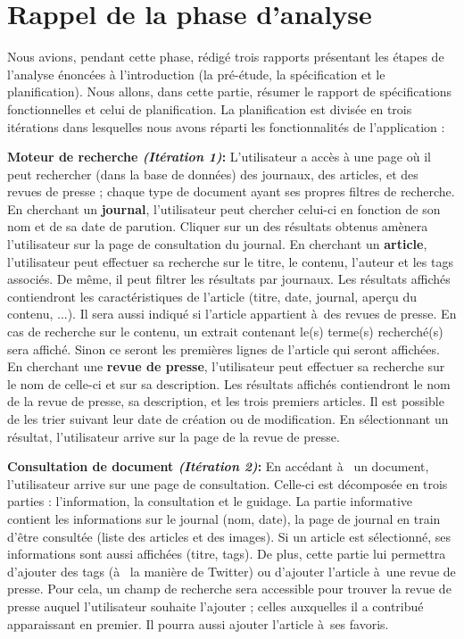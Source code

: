\section{Rappel de la phase d'analyse}
\label{sec:rappel}

	Nous avions, pendant cette phase, rédigé trois rapports présentant les étapes de l'analyse énoncées à l'introduction (la pré-étude\cite{Pretude}, la spécification\cite{Specs} et le planification\cite{Planif}). Nous allons, dans cette partie, résumer le rapport de spécifications fonctionnelles et celui de planification. La planification est  divisée en trois itérations dans lesquelles nous avons réparti les fonctionnalités de l'application : 

	\textbf{Moteur de recherche \textit{(Itération 1)}:} L'utilisateur a accès à une page où il peut rechercher (dans la base de données) des journaux, des articles, et des revues de presse ; chaque type de document ayant ses propres filtres de recherche. En cherchant un \textbf{journal}, l'utilisateur peut chercher celui-ci en fonction de son nom et de sa date de parution. Cliquer sur un des résultats obtenus amènera l'utilisateur sur la page de consultation du journal. En cherchant un \textbf{article}, l'utilisateur peut effectuer sa recherche sur le titre, le contenu, l'auteur et les tags associés. De même, il peut filtrer les résultats par journaux. Les résultats affichés contiendront les caractéristiques de l'article (titre, date, journal, aperçu du contenu, ...). Il sera aussi indiqué si l'article appartient à des revues de presse. En cas de recherche sur le contenu, un extrait contenant le(s) terme(s) recherché(s) sera affiché. Sinon ce seront les premières lignes de l'article qui seront affichées. En cherchant une \textbf{revue de presse}, l'utilisateur peut effectuer sa recherche sur le nom de celle-ci et sur sa description. Les résultats affichés contiendront le nom de la revue de presse, sa description, et les trois premiers articles. Il est possible de les trier suivant leur date de création ou de modification. En sélectionnant un résultat, l'utilisateur arrive sur la page de la revue de presse. 

	\textbf{Consultation de document \textit{(Itération 2)}:} En accédant à  un document, l'utilisateur arrive sur une page de consultation. Celle-ci est décomposée en trois parties : l'information, la consultation et le guidage. La partie informative contient les informations sur le journal (nom, date), la page de journal en train d'être consultée (liste des articles et des images). Si un article est sélectionné, ses informations sont aussi affichées (titre, tags). De plus, cette partie lui permettra d'ajouter des tags (à  la manière de Twitter) ou d'ajouter l'article à une revue de presse. Pour cela, un champ de recherche sera accessible pour trouver la revue de presse auquel l'utilisateur souhaite l'ajouter ; celles auxquelles il a contribué apparaissant en premier. Il pourra aussi ajouter l'article à ses favoris. 

